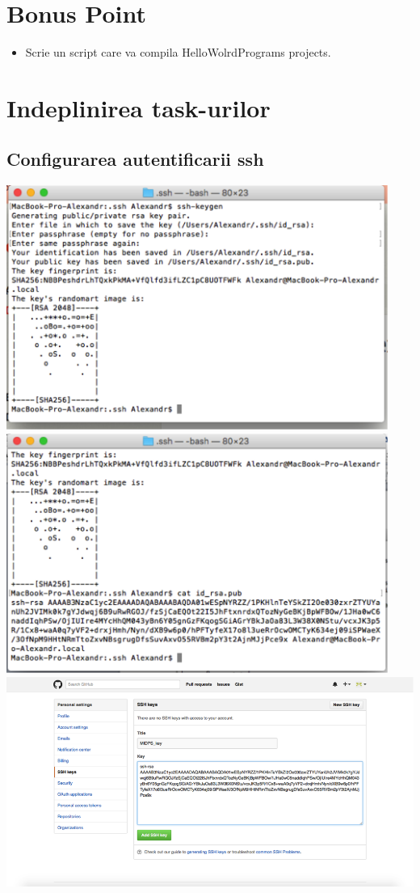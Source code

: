 \documentclass[12pt]{article}
\begin{document}
\section *{Bonus Point}
\begin{itemize}
\item Scrie un script care va compila HelloWolrdPrograms projects.	
\end{itemize}
\section {Indeplinirea task-urilor}
\subsection{Configurarea autentificarii ssh}
\includegraphics[width=12.5cm]{images/1}\\
\includegraphics[width=12.5cm]{images/2}\\
\includegraphics[width=15.5cm]{images/3}\\
\end{document}
